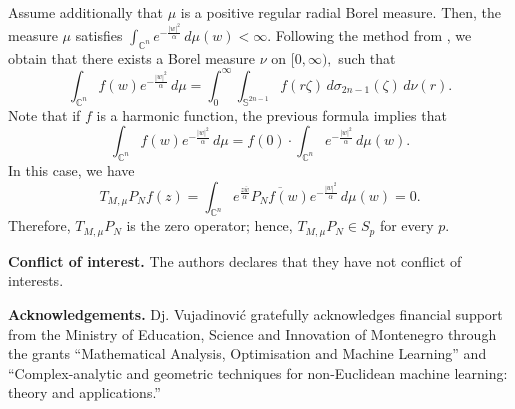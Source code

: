 \documentclass[10pt,leqno]{amsart}
\theoremstyle{remark}
\numberwithin{equation}{section}
\begin{document}
Assume additionally that $\mu$ is a positive regular radial Borel measure. Then, the measure $\mu$ satisfies $\int_{\mathbb{C}^{n}}^{}e^{-\frac{|w|^2}{\alpha}}\, d\mu(w)<\infty. $ Following the method from \cite[Thm 2.4]{maximenkoToeplitzOperatorsBergman2025c}, we obtain that there exists a Borel measure $\nu$ on $[0,\infty),$ such that
\[
	\int_{\mathbb{C}^{n}}^{}f(w)e^{-\frac{|w|^2}{\alpha}}\, d\mu = \int_{0}^{\infty}\int_{\mathbb{S}^{2n-1}}^{}f(r \zeta)\, d\sigma_{{2n-1}}(\zeta) \, d\nu(r).
\]
Note that if $f$ is a harmonic function, the previous formula implies that
\[
	\int_{\mathbb{C}^{n}}^{}f(w)e^{-\frac{|w|^2}{\alpha}}\, d\mu =f(0) \cdot \int_{\mathbb{C}^{n}}^{}e^{-\frac{|w|^2}{\alpha}}\, d\mu(w).
\]
In this case, we have
\[
	T_{M,\mu} P_N f(z)=\int_{\mathbb{C}^{n}}^{}e^{\frac{z \bar{w}}{\alpha}}\overline{P_N f(w)}e^{-\frac{|w|^2}{\alpha}}\, d\mu(w)=0.
\]
Therefore, $T_{M,\mu} P_N$ is the zero operator; hence, $T_{M,\mu} P_N \in S_p$ for every $p.$


\textbf{Conflict of interest.} The authors declares that they have not conflict of interests.

\textbf{Acknowledgements.} Dj. Vujadinović gratefully acknowledges financial
support from the Ministry of Education, Science and Innovation of Montenegro through the
grants “Mathematical Analysis, Optimisation and Machine Learning” and “Complex-analytic
and geometric techniques for non-Euclidean machine learning: theory and applications.”
\end{document}
